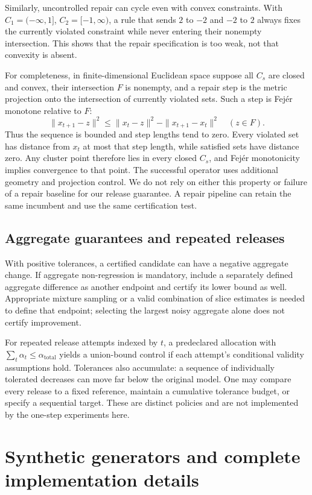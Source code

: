 \documentclass[11pt,letterpaper]{article}
\begin{document}
Similarly, uncontrolled repair can cycle even with convex constraints. With $C_1=(-\infty,1]$, $C_2=[-1,\infty)$, a rule that sends $2$ to $-2$ and $-2$ to $2$ always fixes the currently violated constraint while never entering their nonempty intersection. This shows that the repair specification is too weak, not that convexity is absent.

For completeness, in finite-dimensional Euclidean space suppose all $C_s$ are closed and convex, their intersection $F$ is nonempty, and a repair step is the metric projection onto the intersection of currently violated sets. Such a step is Fej\'er monotone relative to $F$:
\[
\|x_{t+1}-z\|^2\leq\|x_t-z\|^2-\|x_{t+1}-x_t\|^2\quad(z\in F).
\]
Thus the sequence is bounded and step lengths tend to zero. Every violated set has distance from $x_t$ at most that step length, while satisfied sets have distance zero. Any cluster point therefore lies in every closed $C_s$, and Fej\'er monotonicity implies convergence to that point. The successful operator uses additional geometry and projection control. We do not rely on either this property or failure of a repair baseline for our release guarantee. A repair pipeline can retain the same incumbent and use the same certification test.

\subsection{Aggregate guarantees and repeated releases}
With positive tolerances, a certified candidate can have a negative aggregate change. If aggregate non-regression is mandatory, include a separately defined aggregate difference as another endpoint and certify its lower bound as well. Appropriate mixture sampling or a valid combination of slice estimates is needed to define that endpoint; selecting the largest noisy aggregate alone does not certify improvement.

For repeated release attempts indexed by $t$, a predeclared allocation with $\sum_t\alpha_t\leq\alpha_{\mathrm{total}}$ yields a union-bound control if each attempt's conditional validity assumptions hold. Tolerances also accumulate: a sequence of individually tolerated decreases can move far below the original model. One may compare every release to a fixed reference, maintain a cumulative tolerance budget, or specify a sequential target. These are distinct policies and are not implemented by the one-step experiments here.

\section{Synthetic generators and complete implementation details}
\label{app:simulation}
\end{document}
